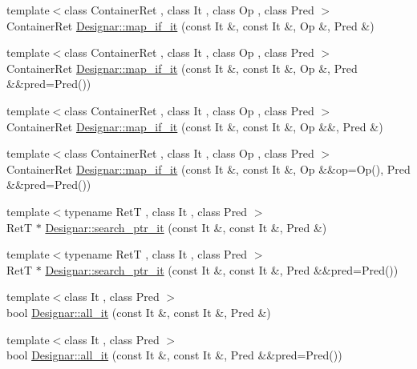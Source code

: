 \begin{DoxyCompactItemize}
\item 
{\footnotesize template$<$class Container\+Ret , class It , class Op , class Pred $>$ }\\Container\+Ret \hyperlink{namespace_designar_ac984c3a6f2c6c94cee1ab57e8fddd3a8}{Designar\+::map\+\_\+if\+\_\+it} (const It \&, const It \&, Op \&, Pred \&)
\item 
{\footnotesize template$<$class Container\+Ret , class It , class Op , class Pred $>$ }\\Container\+Ret \hyperlink{namespace_designar_afebc876d3ceb8615462f21c3ed15eb0c}{Designar\+::map\+\_\+if\+\_\+it} (const It \&, const It \&, Op \&, Pred \&\&pred=Pred())
\item 
{\footnotesize template$<$class Container\+Ret , class It , class Op , class Pred $>$ }\\Container\+Ret \hyperlink{namespace_designar_a5db9dd044c541c52c021da1e1af12032}{Designar\+::map\+\_\+if\+\_\+it} (const It \&, const It \&, Op \&\&, Pred \&)
\item 
{\footnotesize template$<$class Container\+Ret , class It , class Op , class Pred $>$ }\\Container\+Ret \hyperlink{namespace_designar_ae62503515f0226ac0cc91c94c1176fd5}{Designar\+::map\+\_\+if\+\_\+it} (const It \&, const It \&, Op \&\&op=Op(), Pred \&\&pred=Pred())
\item 
{\footnotesize template$<$typename RetT , class It , class Pred $>$ }\\RetT $\ast$ \hyperlink{namespace_designar_aaf2247479f4e93c88a4f6dd39267de5d}{Designar\+::search\+\_\+ptr\+\_\+it} (const It \&, const It \&, Pred \&)
\item 
{\footnotesize template$<$typename RetT , class It , class Pred $>$ }\\RetT $\ast$ \hyperlink{namespace_designar_a6147a7cb2455406a69047efb700e5d50}{Designar\+::search\+\_\+ptr\+\_\+it} (const It \&, const It \&, Pred \&\&pred=Pred())
\item 
{\footnotesize template$<$class It , class Pred $>$ }\\bool \hyperlink{namespace_designar_a1e8a8bf79e4dba3316207968f5c9ee27}{Designar\+::all\+\_\+it} (const It \&, const It \&, Pred \&)
\item 
{\footnotesize template$<$class It , class Pred $>$ }\\bool \hyperlink{namespace_designar_ab48bfea523a4a61cd62aa56fff325920}{Designar\+::all\+\_\+it} (const It \&, const It \&, Pred \&\&pred=Pred())
\item 

\end{DoxyCompactItemize}
